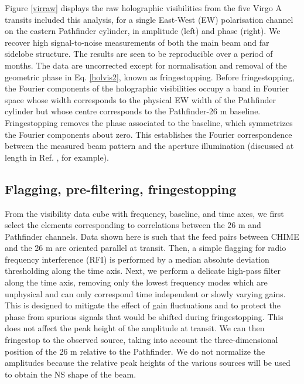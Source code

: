 Figure \ref{virraw} displays the raw holographic visibilities from the five Virgo A transits included this analysis, for a single East-West (EW) polarisation channel on the eastern Pathfinder cylinder, in amplitude (left) and phase (right). We recover high signal-to-noise measurements of both the main beam and far sidelobe structure. The results are seen to be reproducible over a period of months. The data are uncorrected except for normalisation and removal of the geometric phase in Eq. \ref{holvis2}, known as fringestopping. Before fringestopping, the Fourier components of the holographic visibilities occupy a band in Fourier space whose width corresponds to the physical EW width of the Pathfinder cylinder but whose centre corresponds to the Pathfinder-26 m baseline. Fringestopping removes the phase associated to the baseline, which symmetrizes the Fourier components about zero. This establishes the Fourier correspondence between the measured beam pattern and the aperture illumination (discussed at length in Ref. \citep{radio2}, for example).

\subsection{Flagging, pre-filtering, fringestopping}
From the visibility data cube with frequency, baseline, and time axes, we first select the elements corresponding to correlations between the 26 m and Pathfinder channels. Data shown here is such that the feed pairs between CHIME and the 26 m are oriented parallel at transit. Then, a simple flagging for radio frequency interference (RFI) is performed by a median absolute deviation thresholding along the time axis. Next, we perform a delicate high-pass filter along the time axis, removing only the lowest frequency modes which are unphysical and can only correspond time independent or slowly varying gains. This is designed to mitigate the effect of gain fluctuations and to protect the phase from spurious signals that would be shifted during fringestopping. This does not affect the peak height of the amplitude at transit. We can then fringestop to the observed source, taking into account the three-dimensional position of the 26 m relative to the Pathfinder. We do not normalize the amplitudes because the relative peak heights of the various sources will be used to obtain the NS shape of the beam.

